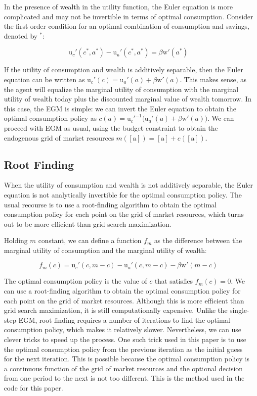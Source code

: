 \documentclass{article}
\newcommand{\DiscFac}{\beta}
\newcommand{\uFunc}{\mathrm{u}}
\newcommand{\aNrm}{a}
\newcommand{\cNrm}{c}
\newcommand{\mNrm}{m}
\newcommand{\wFunc}{\mathrm{w}}
\newcommand{\aMat}{[\mathrm{a}]}
\begin{document}
In the presence of wealth in the utility function, the Euler equation is more complicated and may not be invertible in terms of optimal consumption. Consider the first order condition for an optimal combination of consumption and savings, denoted by $^*$:

\begin{equation}
\uFunc_{c}'(\cNrm^*, \aNrm^*) - \uFunc_{a}'(\cNrm^*, \aNrm^*) = \DiscFac \wFunc'(\aNrm^*)
\end{equation}

If the utility of consumption and wealth is additively separable, then the Euler equation can be written as $\uFunc_{c}'(\cNrm) = \uFunc_{a}'(\aNrm) + \DiscFac \wFunc'(\aNrm)$. This makes sense, as the agent will equalize the marginal utility of consumption with the marginal utility of wealth today plus the discounted marginal value of wealth tomorrow. In this case, the EGM is simple: we can invert the Euler equation to obtain the optimal consumption policy as $\cNrm(\aNrm) = \uFunc_{c}'^{ -1}\big(\uFunc_{a}'(\aNrm) + \DiscFac \wFunc'(\aNrm)\big)$. We can proceed with EGM as usual, using the budget constraint to obtain the endogenous grid of market resources $\mNrm(\aMat) = \aMat + \cNrm(\aMat)$.

\subsection{Root Finding}\label{Root Finding}

When the utility of consumption and wealth is not additively separable, the Euler equation is not analytically invertible for the optimal consumption policy. The usual recourse is to use a root-finding algorithm to obtain the optimal consumption policy for each point on the grid of market resources, which turns out to be more efficient than grid search maximization.

Holding $\mNrm$ constant, we can define a function $f_{m}$ as the difference between the marginal utility of consumption and the marginal utility of wealth:

\begin{equation}
f_{m}(\cNrm) = \uFunc_{c}'(\cNrm, \mNrm - \cNrm) - \uFunc_{a}'(\cNrm, \mNrm - \cNrm) - \DiscFac \wFunc'(\mNrm - \cNrm)
\end{equation}

The optimal consumption policy is the value of $\cNrm$ that satisfies $f_{m}(\cNrm) = 0$. We can use a root-finding algorithm to obtain the optimal consumption policy for each point on the grid of market resources. Although this is more efficient than grid search maximization, it is still computationally expensive. Unlike the single-step EGM, root finding requires a number of iterations to find the optimal consumption policy, which makes it relatively slower. Nevertheless, we can use clever tricks to speed up the process. One such trick used in this paper is to use the optimal consumption policy from the previous iteration as the initial guess for the next iteration. This is possible because the optimal consumption policy is a continuous function of the grid of market resources and the optional decision from one period to the next is not too different. This is the method used in the code for this paper.
\end{document}
